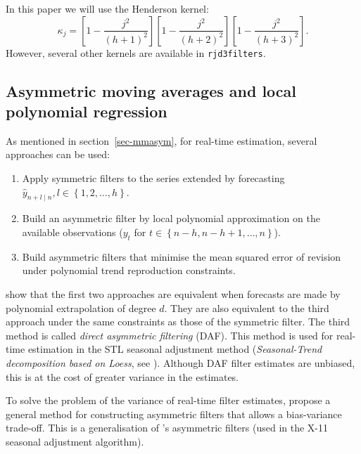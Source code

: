 \documentclass[
]{article}
\newcommand\1{\mathds{1}}
\begin{document}
In this paper we will use the Henderson kernel: \[
\kappa_{j}=\left[1-\frac{j^2}{(h+1)^2}\right]
\left[1-\frac{j^2}{(h+2)^2}\right]
\left[1-\frac{j^2}{(h+3)^2}\right].
\] However, several other kernels are available in \texttt{rjd3filters}.

\subsection{Asymmetric moving averages and local polynomial
regression}\label{sec-lppasymf}

As mentioned in section~\ref{sec-mmasym}, for real-time estimation,
several approaches can be used:

\begin{enumerate}
\def\labelenumi{\arabic{enumi}.}
\item
  Apply symmetric filters to the series extended by forecasting
  \(\hat{y}_{n+l\mid n},l\in\left\{1,2,\dots,h\right\}\).
\item
  Build an asymmetric filter by local polynomial approximation on the
  available observations (\(y_{t}\) for
  \(t\in\left\{n-h,n-h+1,\dots,n\right\}\)).
\item
  Build asymmetric filters that minimise the mean squared error of
  revision under polynomial trend reproduction constraints.
\end{enumerate}

\textcite{proietti2008} show that the first two approaches are
equivalent when forecasts are made by polynomial extrapolation of degree
\(d\). They are also equivalent to the third approach under the same
constraints as those of the symmetric filter. The third method is called
\emph{direct asymmetric filtering} (DAF). This method is used for
real-time estimation in the STL seasonal adjustment method
(\emph{Seasonal-Trend decomposition based on Loess}, see
\textcite{cleveland90}). Although DAF filter estimates are unbiased,
this is at the cost of greater variance in the estimates.

To solve the problem of the variance of real-time filter estimates,
\textcite{proietti2008} propose a general method for constructing
asymmetric filters that allows a bias-variance trade-off. This is a
generalisation of \textcite{musgrave1964set}'s asymmetric filters (used
in the X-11 seasonal adjustment algorithm).
\end{document}
